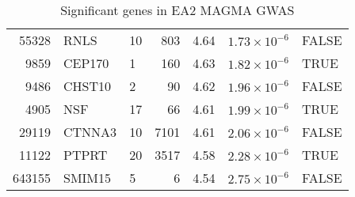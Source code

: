 \begin{table}[ht]
\begin{adjustbox}{totalheight=10in}
\begin{tabular}{rllrrrl}
  55328 & RNLS & 10 & 803 & 4.64 & $1.73 \times 10^{-6}$ & FALSE \\ 
  9859 & CEP170 & 1 & 160 & 4.63 & $1.82 \times 10^{-6}$ & TRUE \\ 
  9486 & CHST10 & 2 &  90 & 4.62 & $1.96 \times 10^{-6}$ & FALSE \\ 
  4905 & NSF & 17 &  66 & 4.61 & $1.99 \times 10^{-6}$ & TRUE \\ 
  29119 & CTNNA3 & 10 & 7101 & 4.61 & $2.06 \times 10^{-6}$ & FALSE \\ 
  11122 & PTPRT & 20 & 3517 & 4.58 & $2.28 \times 10^{-6}$ & TRUE \\ 
  643155 & SMIM15 & 5 &   6 & 4.54 & $2.75 \times 10^{-6}$ & FALSE \\ 
   \hline
\end{tabular}
\end{adjustbox}
\caption{Significant genes in EA2 MAGMA GWAS} 
\label{tab:Significant genes in EA2 MAGMA GWAS}
\end{table}






